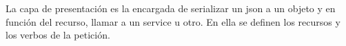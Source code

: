 \documentclass[12pt]{report} %
\begin{document}
 La capa de presentación es la encargada de serializar un json a un objeto y en función del recurso, llamar a un service u otro. En ella se definen los recursos y los verbos de la petición. 
 
 
 
 
	




\clearpage
{}
\printbibliography




\end{document}
